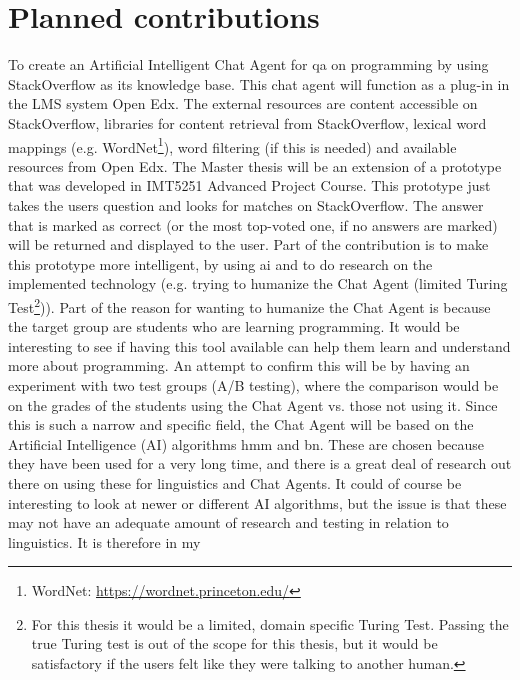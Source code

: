 \section{Planned contributions}
\label{chapter2:planned_contribution}
To create an Artificial Intelligent Chat Agent for \gls{qa} on programming by using StackOverflow as its knowledge base. This chat agent will function as a plug-in in the LMS system 
Open Edx. The external resources are content accessible on StackOverflow, libraries for content retrieval from StackOverflow, lexical word mappings (e.g. WordNet\footnote{WordNet: 
\url{https://wordnet.princeton.edu/}}), word filtering (if this is needed) and available resources from Open Edx.
\vspace{0.5em}\newline
The Master thesis will be an extension of a prototype that was developed in IMT5251 Advanced Project Course. This prototype just takes the users question and looks for matches 
on StackOverflow. The answer that is marked as correct (or the most top-voted one, if no answers are marked) will be returned and displayed to the user. Part of the contribution 
is to make this prototype more intelligent, by using \gls{ai} and to do research on the implemented technology (e.g. trying to humanize the Chat Agent (limited Turing Test\footnote{
	For this thesis it would be a limited, domain specific Turing Test. Passing the true Turing test is out of the scope for this thesis, but it would be satisfactory 
	if the users felt like they were talking to another human.})). Part of the reason for wanting to humanize the Chat Agent is because the target group are students who are 
learning programming. It would be interesting to see if having this tool available can help them learn and understand more about programming. An attempt to confirm this will be 
by having an experiment with two test groups (A/B testing), where the comparison would be on the grades of the students using the Chat Agent vs. those not using it. 
\vspace{0.5em}\newline
Since this is such a narrow and specific field, the Chat Agent will be based on the Artificial Intelligence (AI) algorithms  \gls{hmm} and \gls{bn}. These are chosen 
because they have been used for a very long time, and there is a great deal of research out there on using these for linguistics and Chat Agents. It could of course be interesting 
to look at newer or different AI algorithms, but the issue is that these may not have an adequate amount of research and testing in relation to linguistics. It is therefore in my 
